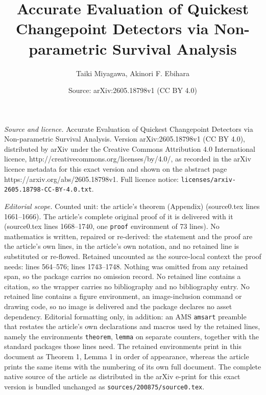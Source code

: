 \documentclass[10pt,a4paper]{amsart}
\title{Accurate Evaluation of Quickest Changepoint Detectors via Non-parametric Survival Analysis}
\author{Taiki Miyagawa, Akinori F. Ebihara}
\date{Source: arXiv:2605.18798v1 (CC BY 4.0)}
\begin{document}
\maketitle

\noindent\emph{Source and licence.} Accurate Evaluation of Quickest Changepoint Detectors via Non-parametric Survival Analysis. Version arXiv:2605.18798v1 (CC BY 4.0), distributed by arXiv under the Creative Commons Attribution 4.0 International licence, http://creativecommons.org/licenses/by/4.0/, as recorded in the arXiv licence metadata for this exact version and shown on the abstract page https://arxiv.org/abs/2605.18798v1. Full licence notice: \texttt{licenses/arxiv-2605.18798-CC-BY-4.0.txt}.\par\smallskip

\noindent\textit{Editorial scope.} Counted unit: the article's theorem (Appendix) (source0.tex lines 1661--1666). The article's complete original proof of it is delivered with it (source0.tex lines 1668--1740, one \texttt{proof} environment of 73 lines). No mathematics is written, repaired or re-derived: the statement and the proof are the article's own lines, in the article's own notation, and no retained line is substituted or re-flowed.  Retained uncounted as the source-local context the proof needs: lines 564--576; lines 1743--1748.  Nothing was omitted from any retained span, so the package carries no omission record.  No retained line contains a citation, so the wrapper carries no bibliography and no bibliography entry.  No retained line contains a figure environment, an image-inclusion command or drawing code, so no image is delivered and the package declares no asset dependency.  Editorial formatting only, in addition: an AMS \texttt{amsart} preamble that restates the article's own declarations and macros used by the retained lines, namely the environments \texttt{theorem}, \texttt{lemma} on separate counters, together with the standard packages those lines need.  The retained environments print in this document as Theorem 1, Lemma 1 in order of appearance, whereas the article prints the same items with the numbering of its own full document.  The complete native source of the article as distributed in the arXiv e-print for this exact version is bundled unchanged as \texttt{sources/200875/source0.tex}.
\end{document}
